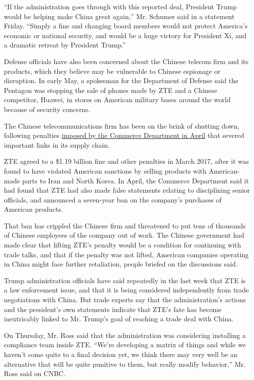 ``If the administration goes through with this reported deal, President
Trump would be helping make China great again,'' Mr. Schumer said in a
statement Friday. ``Simply a fine and changing board members would not
protect America's economic or national security, and would be a huge
victory for President Xi, and a dramatic retreat by President Trump.''

Defense officials have also been concerned about the Chinese telecom
firm and its products, which they believe may be vulnerable to Chinese
espionage or disruption. In early May, a spokesman for the Department of
Defense said the Pentagon was stopping the sale of phones made by ZTE
and a Chinese competitor, Huawei, in stores on American military bases
around the world because of security concerns.

The Chinese telecommunications firm has been on the brink of shutting
down, following penalties
\href{https://www.commerce.gov/news/press-releases/2018/04/secretary-ross-announces-activation-zte-denial-order-response-repeated}{imposed
by the Commerce Department in April} that severed important links in its
supply chain.

ZTE agreed to a \$1.19 billion fine and other penalties in March 2017,
after it was found to have violated American sanctions by selling
products with American-made parts to Iran and North Korea. In April, the
Commerce Department said it had found that ZTE had also made false
statements relating to disciplining senior officials, and announced a
seven-year ban on the company's purchases of American products.

That ban has crippled the Chinese firm and threatened to put tens of
thousands of Chinese employees of the company out of work. The Chinese
government had made clear that lifting ZTE's penalty would be a
condition for continuing with trade talks, and that if the penalty was
not lifted, American companies operating in China might face further
retaliation, people briefed on the discussions said.

Trump administration officials have said repeatedly in the last week
that ZTE is a law enforcement issue, and that it is being considered
independently from trade negotiations with China. But trade experts say
that the administration's actions and the president's own statements
indicate that ZTE's fate has become inextricably linked to Mr. Trump's
goal of reaching a trade deal with China.

On Thursday, Mr. Ross said that the administration was considering
installing a compliance team inside ZTE. ``We're developing a matrix of
things and while we haven't come quite to a final decision yet, we think
there may very well be an alternative that will be quite punitive to
them, but really modify behavior,'' Mr. Ross said on CNBC.

